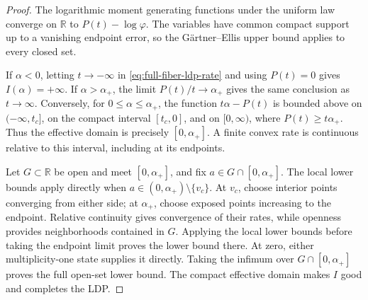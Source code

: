 \begin{proof}
The logarithmic moment generating functions under the uniform law converge
on \(\mathbb R\) to \(P(t)-\log\varphi\).  The variables have common compact
support up to a vanishing endpoint error, so the G\"artner--Ellis upper bound
\cite[Theorem~2.3.6(a)]{DemboZeitouni2010} applies to every closed set.

If \(\alpha<0\), letting \(t\to-\infty\) in
\eqref{eq:full-fiber-ldp-rate} and using \(P(t)=0\) gives
\(I(\alpha)=+\infty\).  If \(\alpha>\alpha_+\), the limit
\(P(t)/t\to\alpha_+\) gives the same conclusion as \(t\to\infty\).
Conversely, for \(0\le\alpha\le\alpha_+\), the function
\(t\alpha-P(t)\) is bounded above on \(( -\infty,t_c]\), on the compact
interval \([t_c,0]\), and on \([0,\infty)\), where
\(P(t)\ge t\alpha_+\).  Thus the effective domain is precisely
\([0,\alpha_+]\).  A finite convex rate is continuous relative to this
interval, including at its endpoints.

Let \(G\subset\mathbb R\) be open and meet \([0,\alpha_+]\), and fix
\(a\in G\cap[0,\alpha_+]\).  The local lower bounds apply directly when
\(a\in(0,\alpha_+)\setminus\{v_c\}\).  At \(v_c\), choose interior points
converging from either side; at \(\alpha_+\), choose exposed points
increasing to the endpoint.  Relative continuity gives convergence of their
rates, while openness provides neighborhoods contained in \(G\).  Applying
the local lower bounds before taking the endpoint limit proves the lower
bound there.  At zero, either multiplicity-one state supplies it directly.
Taking the infimum over \(G\cap[0,\alpha_+]\) proves the full open-set lower
bound.  The compact effective domain makes \(I\) good and completes the LDP.
\end{proof}
\fi
